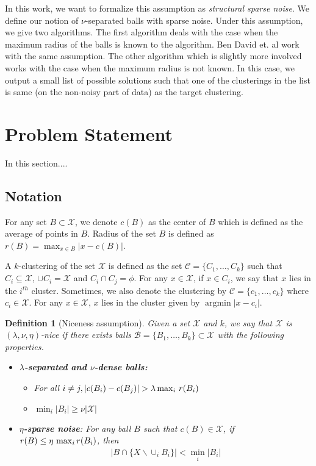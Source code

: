 \documentclass[twoside]{article}
\newcommand{\mc}{\mathcal}
\newtheorem{definition}[theorem]{Definition}
\DeclareMathOperator{\argmin}{argmin}
\begin{document}
In this work, we want to formalize this assumption as \emph{structural sparse noise}. We define our notion of $\nu$-separated balls with sparse noise. Under this assumption, we give two algorithms. The first algorithm deals with the case when the maximum radius of the balls is known to the algorithm. Ben David et. al \cite{ben2014clustering} work with the same assumption. The other algorithm which is slightly more involved works with the case when the maximum radius is not known. In this case, we output a small list of possible solutions such that one of the clusterings in the list is same (on the non-noisy part of data) as the target clustering. 

\section{Problem Statement}
\label{sec:problem}
In this section....
\subsection{Notation}
For any set $B\subset \mc X$, we denote $c(B)$ as the center of $B$ which is defined as the average of points in $B$. Radius of the set $B$ is defined as $r(B)=\max_{x\in B} |x-c(B)|$. 

A $k$-clustering of the set $\mc X$ is defined as the set $\mc C = \{C_1,\ldots,C_k\}$ such that $C_i \subseteq \mc X$, $\cup C_i = \mc X$ and $C_i \cap C_j = \phi$. For any $x \in \mc X$, if $x \in C_i$, we say that $x$ lies in the $i^{th}$ cluster. Sometimes, we also denote the clustering by $\mc C = \{c_1,\ldots,c_k\}$ where $c_i \in \mc X$. For any $x \in \mc X$, $x$ lies in the cluster given by $\argmin |x-c_i|$.

\begin{definition}[Niceness assumption]
Given a set $\mc X$ and $k$, we say that $\mc X$ is $(\lambda,\nu, \eta)$-nice if there exists balls $\mc B=\{B_1,\ldots,B_k\}\subset \mathcal{X}$ with the following properties.
\vspace{-3mm}
\begin{itemize}
\item{\bf{$\lambda$-separated and $\nu$-dense balls}:}
	\begin{itemize}[nolistsep,noitemsep]
	\item[$\diamond$] For all $i\neq j, |c(B_i)-c(B_j)| > \lambda\max_i \thinspace r(B_i)$
	\item[$\diamond$] $\min_i|B_i| \ge \nu |\mc X|$
	\end{itemize}
\item{\bf{$\eta$-sparse noise}}: For any ball $B$ such that $c(B)\in \mathcal{X}$, if $r(B)\leq \eta \thinspace\max_i  r(B_i)$, then 
\begin{align*}
|B\cap \{X \backslash \cup_i B_i\}| < \min_i |B_i|
\end{align*}
\end{itemize}
\label{defn:niceness}
\end{definition}
\end{document}
